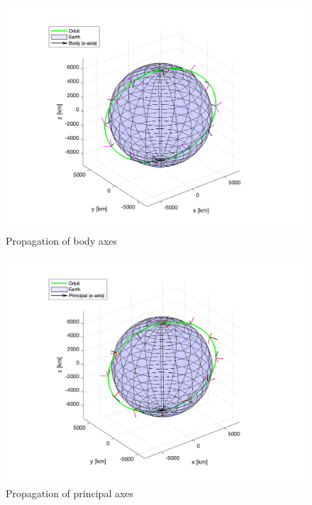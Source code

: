 \begin{figure}[H]
\centering
\includegraphics[scale=0.7]{Images/ps3_problem7c_body.png}
\caption{Propagation of body axes}
\label{fig:ps3_problem7c_body}
\end{figure}

\begin{figure}[H]
\centering
\includegraphics[scale=0.7]{Images/ps3_problem7c_principal.png}
\caption{Propagation of principal axes}
\label{fig:ps3_problem7c_principal}
\end{figure}

